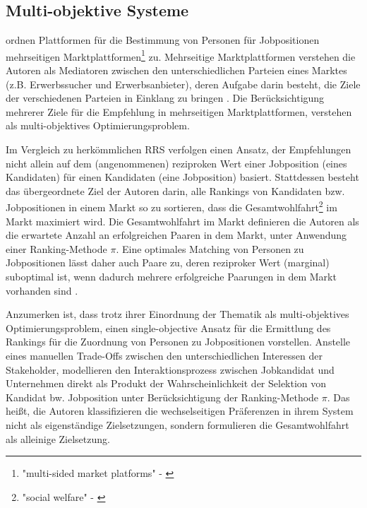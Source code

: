 \subsection{Multi-objektive Systeme}
\textcite[S. 329]{su:inproceedings} ordnen Plattformen für die Bestimmung von Personen für Jobpositionen mehrseitigen Marktplattformen\footnote{"multi-sided market platforms" - \textcite[S. 329]{su:inproceedings}} zu.
Mehrseitige Marktplattformen verstehen die Autoren als Mediatoren zwischen den unterschiedlichen Parteien eines Marktes (z.B. Erwerbssucher und Erwerbsanbieter), deren Aufgabe darin besteht, die Ziele der verschiedenen Parteien in Einklang zu bringen \cite[S. 329]{su:inproceedings}.
Die Berücksichtigung mehrerer Ziele für die Empfehlung in mehrseitigen Marktplattformen, verstehen \textcite[S. 329]{su:inproceedings} als multi-objektives Optimierungsproblem.

Im Vergleich zu herkömmlichen \ac{RRS} verfolgen \textcite[S. 328ff.]{su:inproceedings} einen Ansatz, der Empfehlungen nicht allein auf dem (angenommenen) reziproken Wert einer Jobposition (eines Kandidaten) für einen Kandidaten (eine Jobposition) basiert.
Stattdessen besteht das übergeordnete Ziel der Autoren darin, alle Rankings von Kandidaten bzw. Jobpositionen in einem Markt so zu sortieren, dass die Gesamtwohlfahrt\footnote{"social welfare" - \textcite[S. 329]{su:inproceedings}} im Markt maximiert wird.
Die Gesamtwohlfahrt im Markt definieren die Autoren als die erwartete Anzahl an erfolgreichen Paaren in dem Markt, unter Anwendung einer Ranking-Methode $\pi$.
Eine optimales Matching von Personen zu Jobpositionen lässt daher auch Paare zu, deren reziproker Wert (marginal) suboptimal ist, wenn dadurch mehrere erfolgreiche Paarungen in dem Markt vorhanden sind \cite[S. 334]{su:inproceedings}.

Anzumerken ist, dass \textcite[S. 328ff.]{su:inproceedings} trotz ihrer Einordnung der Thematik als multi-objektives Optimierungsproblem, einen single-objective Ansatz für die Ermittlung des Rankings für die Zuordnung von Personen zu Jobpositionen vorstellen.
Anstelle eines manuellen Trade-Offs zwischen den unterschiedlichen Interessen der Stakeholder, modellieren \textcite[S. 329]{su:inproceedings} den Interaktionsprozess zwischen Jobkandidat und Unternehmen direkt als Produkt der Wahrscheinlichkeit der Selektion von Kandidat bw. Jobposition unter Berücksichtigung der Ranking-Methode $\pi$.
Das heißt, die Autoren klassifizieren die wechselseitigen Präferenzen in ihrem System nicht als eigenständige Zielsetzungen, sondern formulieren die Gesamtwohlfahrt als alleinige Zielsetzung.


